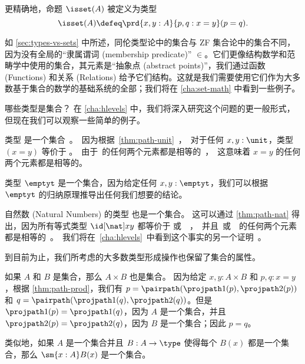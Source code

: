 更精确地，命题 $\isset(A)$ 被定义为类型
\[ \isset(A) \defeq \prd{x,y:A}{p,q:x=y} (p=q). \]

如 \cref{sec:types-vs-sets} 中所述，同伦类型论中的集合与 ZF 集合论中的集合不同，因为没有全局的“隶属谓词 (membership predicate)” $\in$。它们更像结构数学和范畴学中使用的集合，其元素是“抽象点 (abstract points)”，我们通过函数 (Functions) 和关系 (Relations) 给予它们结构。这就是我们需要使用它们作为大多数基于集合的数学的基础系统的全部；我们将在 \cref{cha:set-math} 中看到一些例子。

哪些类型是集合？
在 \cref{cha:hlevels} 中，我们将深入研究这个问题的更一般形式，但现在我们可以观察一些简单的例子。

\begin{eg}\label{eg:isset-unit}
类型 \unit 是一个集合。
因为根据 \cref{thm:path-unit}，对于任何 $x,y:\unit$，类型 $(x=y)$ 等价于 \unit。由于 \unit 的任何两个元素都是相等的，这意味着 $x=y$ 的任何两个元素都是相等的。
\end{eg}

\begin{eg}\label{eg:isset-empty}
类型 $\emptyt$ 是一个集合，因为给定任何 $x,y:\emptyt$，我们可以根据 $\emptyt$ 的归纳原理推导出任何我们想要的结论。
\end{eg}

\begin{eg}\label{thm:nat-set}
自然数 (Natural Numbers) 的类型 \nat 也是一个集合。
这可以通过 \cref{thm:path-nat} 得出，因为所有等式类型 $\id[\nat]xy$ 都等价于 \unit 或 \emptyt，并且 \unit 或 \emptyt 的任何两个元素都是相等的。我们将在 \cref{cha:hlevels} 中看到这个事实的另一个证明。
\end{eg}

到目前为止，我们所考虑的大多数类型形成操作也保留了集合的属性。

\begin{eg}\label{thm:isset-prod}
如果 $A$ 和 $B$ 是集合，那么 $A\times B$ 也是集合。
因为给定 $x,y:A\times B$ 和 $p,q:x=y$，根据 \cref{thm:path-prod}，我们有 $p= \pairpath(\projpath1(p),\projpath2(p))$ 和 $q= \pairpath(\projpath1(q),\projpath2(q))$。但是 $\projpath1(p)=\projpath1(q)$，因为 $A$ 是一个集合，并且 $\projpath2(p)=\projpath2(q)$，因为 $B$ 是一个集合；因此 $p=q$。

类似地，如果 $A$ 是一个集合并且 $B:A\to\type$ 使得每个 $B(x)$ 都是一个集合，那么 $\sm{x:A} B(x)$ 是一个集合。
\end{eg}

